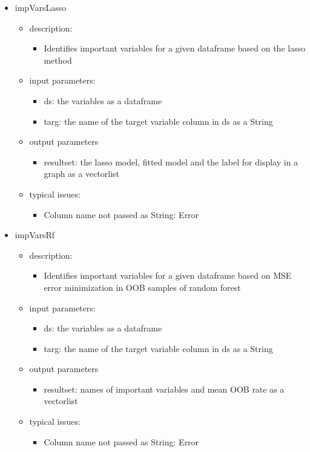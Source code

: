 \documentclass[11pt]{article}
\begin{document}
\begin{itemize}
\item impVarsLasso
	\begin{itemize}
	\item description: 
		\begin{itemize}
		\item Identifies important variables for a given dataframe based on the lasso method
		\end{itemize}
	\item input parameters: 
		\begin{itemize}
		\item ds: the variables as a dataframe
		\item targ: the name of the target variable column in ds as a String
		\end{itemize}
	\item output parameters
		\begin{itemize}
		\item resultset: the lasso model, fitted model and the label for display in a graph as a vectorlist   
		\end{itemize}
	\item typical issues:
		\begin{itemize}
		\item Column name not passed as String: Error
		\end{itemize}
	\end{itemize}

\item impVarsRf
	\begin{itemize}
	\item description: 
		\begin{itemize}
		\item Identifies important variables for a given dataframe based on MSE error minimization in OOB samples of random forest
		\end{itemize}
	\item input parameters: 
		\begin{itemize}
		\item ds: the variables as a dataframe
		\item targ: the name of the target variable column in ds as a String
		\end{itemize}
	\item output parameters
		\begin{itemize}
		\item resultset: names of important variables and mean OOB rate as a vectorlist
		\end{itemize}
	\item typical issues:
		\begin{itemize}
		\item Column name not passed as String: Error
		\end{itemize}
	\end{itemize}


\end{itemize}
\end{document}
